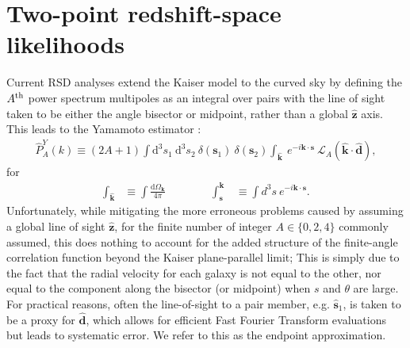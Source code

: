 \documentclass[useAMS,usenatbib]{mn2e}
\newcommand{\vb}[1]{\mathbf{#1}}
\begin{document}
\section{Two-point redshift-space likelihoods}
\label{sec:twopoint_estimators}
Current RSD analyses extend the Kaiser model to the curved sky by defining the $A^{\rm th}$ power spectrum multipoles as an integral over pairs with the line of sight taken to be either the angle bisector or midpoint, rather than a global $\boldsymbol{ \hat z}$ axis.  This leads to the Yamamoto estimator \citep{Yam06}:
\begin{align}
\label{eq:PkY}
  \hat{P}_A^Y(k) \equiv (2A +1) \int \mathrm{d}^3 s_1 \ \mathrm{d}^3 s_2\ \delta(\vb{s}_1) \ \delta(\vb{s}_2) \int_{\boldsymbol {\hat k}} \ e^{-i\vb{k} \cdot \vb{s}} \ \mathcal{L}_A\left(\boldsymbol {\hat k} \cdot \boldsymbol {\hat d} \right),
\end{align}
for 
\begin{align}
\int_{\boldsymbol{ \hat k}} & \equiv \int \frac{\mathrm{d} \Omega_\vb{k}}{4\pi}  \qquad \qquad
\int_{\boldsymbol s}^{\boldsymbol k} & \equiv  \int d^3s \ e^{-i\vb{k}\cdot \vb{s}}.
\end{align}
Unfortunately, while mitigating the more erroneous problems caused by assuming a global line of sight $\boldsymbol {\hat z}$, for the finite number of integer $A \in \{ 0, 2, 4 \}$ commonly assumed, this does nothing to account for the added structure of the finite-angle correlation function beyond the Kaiser plane-parallel limit;  This is simply due to the fact that the radial velocity for each galaxy is not equal to the other, nor equal to the component along the bisector (or midpoint) when $s$ and $\theta$ are large.  For practical reasons, often the line-of-sight to a pair member, e.g. $\boldsymbol {\hat s}_1$, is taken to be a proxy for $\boldsymbol {\hat d}$, which allows for efficient Fast Fourier Transform evaluations but leads to systematic error.  We refer to this as the endpoint approximation.     
\end{document}
